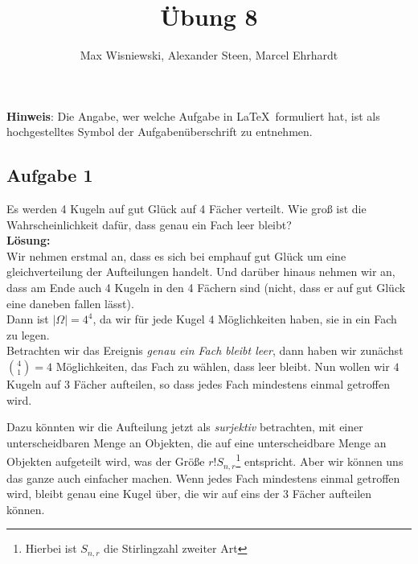 \documentclass[11pt,a4paper,ngerman]{article}
\date{}
\title{Übung 8}
\author{Max Wisniewski\maxw, Alexander Steen\alex, Marcel Ehrhardt\marcel}
\begin{document}

\renewcommand{\figurename}{Figure}

\maketitle
\thispagestyle{fancy}

\begin{center}
\textbf{Hinweis}: Die Angabe, wer welche Aufgabe in \LaTeX\ formuliert hat, ist als hochgestelltes Symbol der Aufgabenüberschrift zu entnehmen.
\end{center}


\subsection*{Aufgabe 1}

Es werden 4 Kugeln auf gut Glück auf 4 Fächer verteilt. Wie groß ist die Wahrscheinlichkeit dafür, dass genau ein Fach leer bleibt?\\

\textbf{Lösung:}\\

Wir nehmen erstmal an, dass es sich bei emph{auf gut Glück} um eine gleichverteilung der Aufteilungen handelt. Und darüber hinaus nehmen
wir an, dass am Ende auch 4 Kugeln in den 4 Fächern sind (nicht, dass er auf gut Glück eine daneben fallen lässt).\\

Dann ist $\left| \Omega \right| = 4^4$, da wir für jede Kugel $4$ Möglichkeiten haben, sie in ein Fach zu legen.\\

Betrachten wir das Ereignis \emph{genau ein Fach bleibt leer}, dann haben wir zunächst $\binom{4}{1} = 4$ Möglichkeiten, das Fach zu wählen,
dass leer bleibt. Nun wollen wir $4$ Kugeln auf $3$ Fächer aufteilen, so dass jedes Fach mindestens einmal getroffen wird.

Dazu könnten wir die Aufteilung jetzt als \emph{surjektiv} betrachten, mit einer unterscheidbaren Menge an Objekten, die auf eine unterscheidbare
Menge an Objekten aufgeteilt wird, was der Größe $r!S_{n,r}$\footnote{Hierbei ist $S_{n,r}$ die Stirlingzahl zweiter Art} entspricht. Aber wir können uns
das ganze auch einfacher machen. Wenn jedes Fach mindestens einmal getroffen wird, bleibt genau eine Kugel über, die wir auf eins der 3 Fächer aufteilen können.
\end{document}
